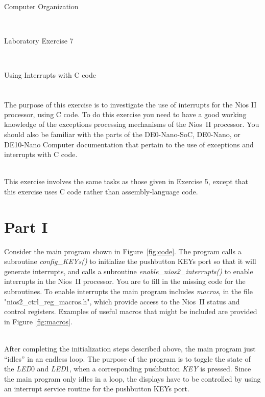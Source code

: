 \documentclass[epsfig,10pt,fullpage]{article}
\newcommand{\LabNum}{7}
\begin{document}
\centerline{\huge Computer Organization}
~\\
\centerline{\huge Laboratory Exercise \LabNum}
~\\
\centerline{\large Using Interrupts with C code}
~\\


The purpose of this exercise is to investigate the use of interrupts for the Nios\textsuperscript{\textregistered} II
processor, using C code. To do this exercise you need to have a good working knowledge of
the exceptions processing mechanisms of the Nios~II processor.  You should also be
familiar with the parts of the DE0-Nano-SoC, DE0-Nano, or DE10-Nano Computer documentation that pertain 
to the use of exceptions and interrupts with C code.

~\\
This exercise involves the same tasks as those given in Exercise 5,
except that this exercise uses C code rather than assembly-language code.

\section*{Part I}
Consider the main program shown in Figure~\ref{fig:code}. The program calls a 
subroutine {\it config\_KEYs()} to initialize the pushbutton KEYs port so that it will generate
interrupts, and calls a subroutine {\it enable\_nios2\_interrupts()} to enable
interrupts in the Nios~II processor. You are to fill in the missing code for the 
subroutines. To enable interrupts the main program includes
{\it macros}, in the file "nios2\_ctrl\_reg\_macros.h", which provide access to the Nios~II
status and control registers.  Examples of useful macros that might be included 
are provided in Figure \ref{fig:macros}. 

~\\
After completing the initialization steps
described above, the main program just ``idles'' in an endless loop.
The purpose of the program is to toggle the state of the {\it LED}0 and {\it LED}1, when a corresponding 
pushbutton {\it KEY} is pressed. Since the main program only idles in a loop, the displays 
have to be controlled by using an interrupt service routine for the pushbutton KEYs port. 
\end{document}
